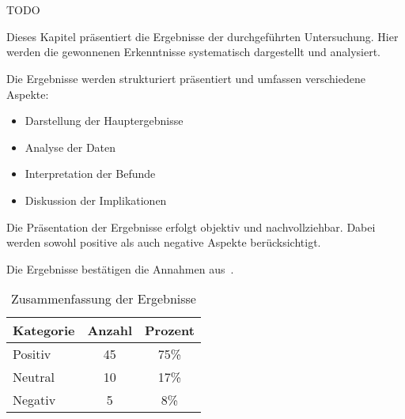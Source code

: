 
\chapter{\resultsLabel}\label{cha:results}

TODO

Dieses Kapitel präsentiert die Ergebnisse der durchgeführten Untersuchung. Hier werden die gewonnenen Erkenntnisse systematisch dargestellt und analysiert.

Die Ergebnisse werden strukturiert präsentiert und umfassen verschiedene Aspekte:

\begin{itemize}[leftmargin=0.63cm, label=\textbullet]
    \item Darstellung der Hauptergebnisse
    \item Analyse der Daten
    \item Interpretation der Befunde
    \item Diskussion der Implikationen
\end{itemize}

Die Präsentation der Ergebnisse erfolgt objektiv und nachvollziehbar. Dabei werden sowohl positive als auch negative Aspekte berücksichtigt.

Die Ergebnisse bestätigen die Annahmen aus~\cite{beispiel2024}.

\begin{table}[htbp]
    \centering
    \caption{Zusammenfassung der Ergebnisse}
    \label{tab:ergebnisse}
        \begin{tabular}{lcc}
        \toprule
        Kategorie & Anzahl & Prozent \\
        \midrule
        Positiv & 45 & 75\% \\
        Neutral & 10 & 17\% \\
        Negativ & 5 & 8\% \\
        \bottomrule
        \end{tabular}
\end{table}

